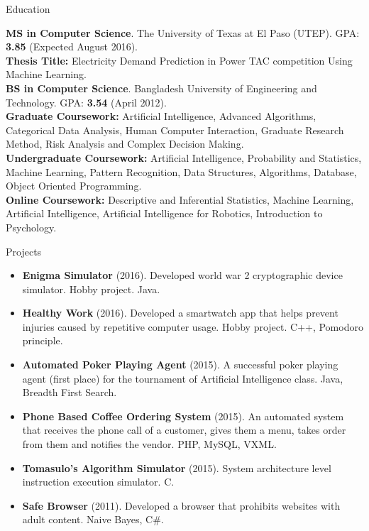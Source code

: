 \documentclass[]{mcdowellcv}
\begin{document}
	\begin{cvsection}{Education}
		\begin{cvsubsection}{}{}{}
				\textbf{MS in Computer Science}. The University of Texas at El Paso (UTEP).  GPA: \textbf{3.85} (Expected August 2016). \\
				\textbf{Thesis Title:} Electricity Demand Prediction in Power TAC competition Using Machine Learning. \\
				\textbf{BS in Computer Science}. Bangladesh University of Engineering and Technology. GPA: \textbf{3.54} (April 2012).  \\
				\textbf{Graduate Coursework:} Artificial Intelligence, Advanced Algorithms, Categorical Data Analysis, Human Computer Interaction, Graduate Research Method, Risk Analysis and Complex Decision Making. \\
				\textbf{Undergraduate Coursework:} Artificial Intelligence, Probability and Statistics, Machine Learning, Pattern Recognition, Data Structures, Algorithms, Database, Object Oriented Programming. \\
				\textbf{Online Coursework:} Descriptive and Inferential Statistics, Machine Learning, Artificial Intelligence, Artificial Intelligence for Robotics, Introduction to Psychology.
		\end{cvsubsection}
	\end{cvsection}
	
	\begin{cvsection}{Projects}
		\begin{cvsubsection}{}{}{}
			\begin{itemize}
			\item \textbf{Enigma Simulator} (2016).  Developed world war 2 cryptographic device simulator. Hobby project.  Java.
				\item \textbf{Healthy Work} (2016). Developed a smartwatch app that helps prevent injuries caused by repetitive computer usage. Hobby project. C++, Pomodoro principle.				
				\item \textbf{Automated Poker Playing Agent} (2015). A successful poker playing agent (first place) for the tournament of Artificial Intelligence class. Java, Breadth First Search.
				\item \textbf{Phone Based Coffee Ordering System} (2015). An automated system that receives the phone call of a customer, gives them a menu, takes order from them and notifies the vendor.  PHP, MySQL, VXML.
				\item \textbf{Tomasulo’s Algorithm Simulator} (2015). System architecture level instruction execution simulator. C.
\item \textbf{Safe Browser} (2011). Developed a browser that prohibits websites with adult content. Naive Bayes, C\#.
			\end{itemize}
		\end{cvsubsection}
	\end{cvsection}
	
\end{document}
